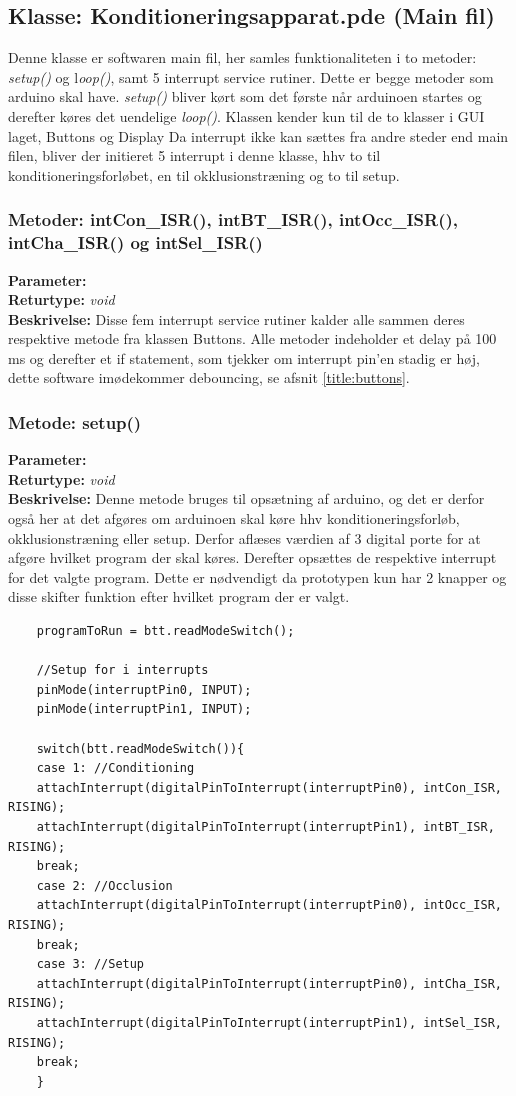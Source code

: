 \subsection{Klasse: Konditioneringsapparat.pde (Main fil)}
Denne klasse er softwaren main fil, her samles funktionaliteten i to metoder: \textit{setup()} og l\textit{oop()}, samt 5 interrupt service rutiner. Dette er begge metoder som arduino skal have. \textit{setup()} bliver kørt som det første når arduinoen startes og derefter køres det uendelige \textit{loop()}. Klassen kender kun til de to klasser i GUI laget, Buttons og Display
Da interrupt ikke kan sættes fra andre steder end main filen, bliver der initieret 5 interrupt i denne klasse, hhv to til konditioneringsforløbet, en til okklusionstræning og to til setup.

\subsubsection{Metoder: intCon\_ISR(), intBT\_ISR(), intOcc\_ISR(), intCha\_ISR() og intSel\_ISR()}
\textbf{Parameter: } 
\\ \textbf{Returtype: } \textit{void}
\\ \textbf{Beskrivelse: } Disse fem interrupt service rutiner kalder alle sammen deres respektive metode fra klassen Buttons. Alle metoder indeholder et delay på 100 ms og derefter et if statement, som tjekker om interrupt pin’en stadig er høj, dette software imødekommer debouncing, se afsnit \ref{title:buttons}.


\subsubsection{Metode: setup()}
\textbf{Parameter: } 
\\ \textbf{Returtype: } \textit{void}
\\ \textbf{Beskrivelse: } Denne metode bruges til opsætning af arduino, og det er derfor også her at det afgøres om arduinoen skal køre hhv konditioneringsforløb, okklusionstræning eller setup. Derfor aflæses værdien af 3 digital porte for at afgøre hvilket program der skal køres. Derefter opsættes de respektive interrupt for det valgte program. Dette er nødvendigt da prototypen kun har 2 knapper og disse skifter funktion efter hvilket program der er valgt.
\begin{lstlisting}
	programToRun = btt.readModeSwitch();
	
	//Setup for i interrupts
	pinMode(interruptPin0, INPUT);
	pinMode(interruptPin1, INPUT);
	
	switch(btt.readModeSwitch()){
	case 1: //Conditioning
	attachInterrupt(digitalPinToInterrupt(interruptPin0), intCon_ISR, RISING);
	attachInterrupt(digitalPinToInterrupt(interruptPin1), intBT_ISR, RISING);
	break;
	case 2: //Occlusion
	attachInterrupt(digitalPinToInterrupt(interruptPin0), intOcc_ISR, RISING);
	break;
	case 3: //Setup
	attachInterrupt(digitalPinToInterrupt(interruptPin0), intCha_ISR, RISING);
	attachInterrupt(digitalPinToInterrupt(interruptPin1), intSel_ISR, RISING);
	break;
	}
\end{lstlisting}

